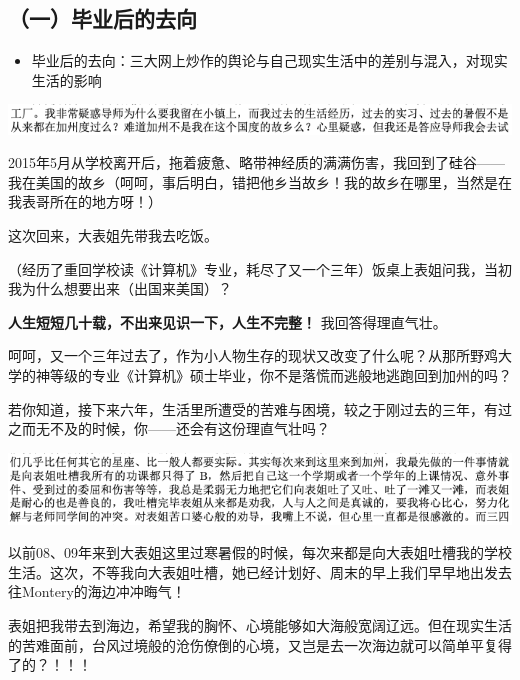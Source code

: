 \documentclass[9pt, b5paper]{article}
\begin{document}
\subsection{（一）毕业后的去向}
\label{sec:org1002d6d}

\begin{itemize}
\item 毕业后的去向：三大网上炒作的舆论与自己现实生活中的差别与混入，对现实生活的影响
\end{itemize}

\begin{center}
\includegraphics[width=.9\linewidth]{./pic/backups_plans_20210426_095826.png}
\end{center}

2015年5月从学校离开后，拖着疲惫、略带神经质的满满伤害，我回到了硅谷——我在美国的故乡（呵呵，事后明白，错把他乡当故乡！我的故乡在哪里，当然是在我表哥所在的地方呀！）

这次回来，大表姐先带我去吃饭。

（经历了重回学校读《计算机》专业，耗尽了又一个三年）饭桌上表姐问我，当初我为什么想要出来（出国来美国）？

\textbf{人生短短几十载，不出来见识一下，人生不完整！} 我回答得理直气壮。

呵呵，又一个三年过去了，作为小人物生存的现状又改变了什么呢？从那所野鸡大学的神等级的专业《计算机》硕士毕业，你不是落慌而逃般地逃跑回到加州的吗？

若你知道，接下来六年，生活里所遭受的苦难与困境，较之于刚过去的三年，有过之而无不及的时候，你——还会有这份理直气壮吗？

\begin{center}
\includegraphics[width=.9\linewidth]{./pic/backups_plans_20210426_094357.png}
\end{center}

以前08、09年来到大表姐这里过寒暑假的时候，每次来都是向大表姐吐槽我的学校生活。这次，不等我向大表姐吐槽，她已经计划好、周末的早上我们早早地出发去往Montery的海边冲冲晦气！

表姐把我带去到海边，希望我的胸怀、心境能够如大海般宽阔辽远。但在现实生活的苦难面前，台风过境般的沧伤僚倒的心境，又岂是去一次海边就可以简单平复得了的？！！！
\end{document}
